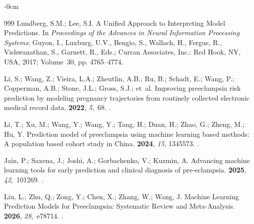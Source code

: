 \documentclass[diagnostics,article,accept,pdftex,moreauthors]{Definitions/mdpi}
\begin{document}
\begin{adjustwidth}{-\extralength}{0cm}
\begin{thebibliography}{999}
Lundberg, S.M.; Lee, S.I.
\newblock A Unified Approach to Interpreting Model Predictions.
\newblock In \emph{Proceedings of the Advances in Neural Information Processing
  Systems}; Guyon, I., Luxburg, U.V., Bengio, S., Wallach, H., Fergus, R.,
  Vishwanathan, S., Garnett, R., Eds.; {Curran Associates, Inc.: Red Hook, NY,
    USA,} %
  2017; Volume~30,
  pp. 4765--4774.

Li, S.; Wang, Z.; Vieira, L.A.; Zheutlin, A.B.; Ru, B.; Schadt, E.; Wang, P.;
  Copperman, A.B.; Stone, J.L.; Gross, S.J.;  et~al.
\newblock Improving preeclampsia risk prediction by modeling pregnancy
  trajectories from routinely collected electronic medical record data.
 {\bf 2022}, {\em 5},~68.
.

Li, T.; Xu, M.; Wang, Y.; Wang, Y.; Tang, H.; Duan, H.; Zhao, G.; Zheng, M.;
  Hu, Y.
\newblock Prediction model of preeclampsia using machine learning based
  methods: A population based cohort study in China.
 {\bf 2024}, {\em  15}, 1345573.
.

Jain, P.; Saxena, J.; Joshi, A.; Gorbachenko, V.; Kuzmin, A.
\newblock Advancing machine learning tools for early prediction and clinical
  diagnosis of pre-eclampsia.
 {\bf 2025}, {\em 42},~101269.
.

Liu, L.; Zhu, Q.; Zong, Y.; Chen, X.; Zhang, W.; Wang, J.
\newblock Machine Learning Prediction Models for Preeclampsia: Systematic
  Review and Meta-Analysis.
 {\bf 2026}, {\em 28},~e78714.
.


\end{thebibliography}
\end{adjustwidth}
\end{document}
